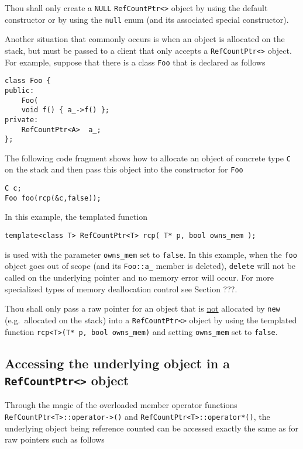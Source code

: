 \begin{commandment}
Thou shall only create a \texttt{NULL}
\texttt{RefCountPtr<>} object by using the default constructor
or by using the \texttt{null} enum (and its associated special
constructor).
\end{commandment}

Another situation that commonly occurs is when an object is allocated
on the stack, but must be passed to a client that only accepts a
\texttt{RefCountPtr<>} object.  For example, suppose that there is a
class \texttt{Foo} that is declared as follows
%
{\scriptsize\begin{verbatim}
class Foo {
public:
    Foo(
    void f() { a_->f() };
private:
    RefCountPtr<A>  a_;
};
\end{verbatim}}
%
The following code fragment shows how to allocate an object of concrete
type \texttt{C} on the stack and then pass this object into the constructor
for \texttt{Foo}
%
{\scriptsize\begin{verbatim}
C c;
Foo foo(rcp(&c,false));
\end{verbatim}}
%
In this example, the templated function
%
{\scriptsize\begin{verbatim}
template<class T> RefCountPtr<T> rcp( T* p, bool owns_mem );
\end{verbatim}}
%
\noindent{}is used with the parameter \texttt{owns\_mem} set to
\texttt{false}.  In this example, when the \texttt{foo} object
goes out of scope (and its \texttt{Foo::a\_} member is deleted),
\texttt{delete} will not be called on the underlying pointer and no
memory error will occur.  For more specialized types of memory
deallocation control see Section ???.

\begin{commandment}
Thou shall only pass a raw pointer for an object that is
\underline{not} allocated by \texttt{new} (e.g.~allocated on the stack) into a
\texttt{RefCountPtr<>} object by using the templated function
\texttt{rcp<T>(T* p, bool owns\_mem)} and setting \texttt{owns\_mem} set
to \texttt{false}.
\end{commandment}

%
\subsection{Accessing the underlying object in a \texttt{RefCountPtr<>} object}
%

Through the magic of the overloaded member operator functions
\texttt{RefCountPtr<T>::operator->()} and
\texttt{RefCountPtr<T>::operator*()}, the underlying object being reference
counted can be accessed exactly the same as for raw pointers such as
follows


